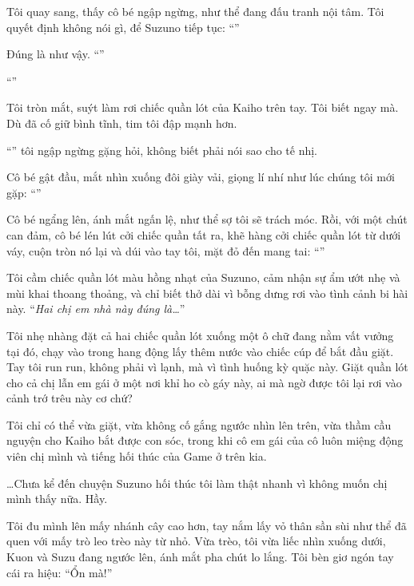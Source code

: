 \documentclass[../main.tex]{subfiles}
\begin{document}
Tôi quay sang, thấy cô bé ngập ngừng, như thể đang đấu tranh nội tâm. Tôi quyết định không nói gì, để Suzuno tiếp tục: ``''

Đúng là như vậy. ``''

``''

Tôi tròn mắt, suýt làm rơi chiếc quần lót của Kaiho trên tay. Tôi biết ngay mà. Dù đã cố giữ bình tĩnh, tim tôi đập mạnh hơn.

``''  tôi ngập ngừng gặng hỏi, không biết phải nói sao cho tế nhị.

Cô bé gật đầu, mắt nhìn xuống đôi giày vải, giọng lí nhí như lúc chúng tôi mới gặp: ``''

Cô bé ngẩng lên, ánh mắt ngấn lệ, như thể sợ tôi sẽ trách móc. Rồi, với một chút can đảm, cô bé lén lút cởi chiếc quần tất ra, khẽ hàng cởi chiếc quần lót từ dưới váy, cuộn tròn nó lại và dúi vào tay tôi, mặt đỏ đến mang tai: ``''

Tôi cầm chiếc quần lót màu hồng nhạt của Suzuno, cảm nhận sự ẩm ướt nhẹ và mùi khai thoang thoảng, và chỉ biết thở dài vì bỗng dưng rơi vào tình cảnh bi hài này. ``\textit{Hai chị em nhà này đúng là\dots}''

Tôi nhẹ nhàng đặt cả hai chiếc quần lót xuống một ô chữ đang nằm vất vưởng tại đó, chạy vào trong hang động lấy thêm nước vào chiếc cúp để bắt đầu giặt. Tay tôi run run, không phải vì lạnh, mà vì tình huống kỳ quặc này. Giặt quần lót cho cả chị lẫn em gái ở một nơi khỉ ho cò gáy này, ai mà ngờ được tôi lại rơi vào cảnh trớ trêu này cơ chứ?

Tôi chỉ có thể vừa giặt, vừa không cố gắng ngước nhìn lên trên, vừa thầm cầu nguyện cho Kaiho bắt được con sóc, trong khi cô em gái của cô luôn miệng động viên chị mình và tiếng hối thúc của Game ở trên kia.

\dots Chưa kể đến chuyện Suzuno hối thúc tôi làm thật nhanh vì không muốn chị mình thấy nữa. Hầy.


Tôi đu mình lên mấy nhánh cây cao hơn, tay nắm lấy vỏ thân sần sùi như thể đã quen với mấy trò leo trèo này từ nhỏ. Vừa trèo, tôi vừa liếc nhìn xuống dưới, Kuon và Suzu đang ngước lên, ánh mắt pha chút lo lắng. Tôi bèn giơ ngón tay cái ra hiệu: ``Ổn mà!''
\end{document}
